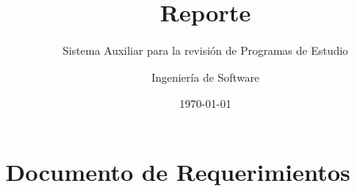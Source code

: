 \documentclass[10pt]{report}
\title{Reporte}
\subtitle{Sistema Auxiliar para la revisión de Programas de Estudio}
\author{Ingeniería de Software}
\date{\today}
\begin{document}
\maketitle
\thispagestyle{empty}
\tableofcontents




\chapter{Documento de Requerimientos}




\end{document}
